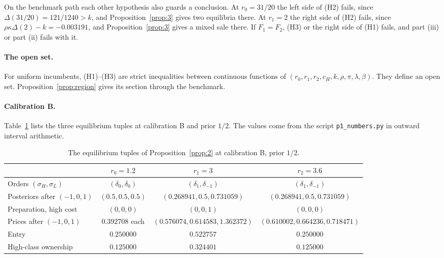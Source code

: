 \documentclass[11pt]{article}
\theoremstyle{definition}
\begin{document}
On the benchmark path each other hypothesis also guards a conclusion. At $r_0=31/20$ the left side of (H2)
fails, since $\Delta(31/20)=121/1240>k$, and Proposition~\ref{prop:3} gives two equilibria there. At $r_1=2$ the
right side of (H2) fails, since $\rho\kappa\Delta(2)-k=-0.003191$, and Proposition~\ref{prop:3} gives a mixed sale
there. If $F_1=F_2$, (H3) or the right side of (H1) fails, and part (iii) or part (ii) fails with it.

\paragraph{The open set.} For uniform incumbents, (H1)--(H3) are strict inequalities between continuous
functions of $(r_0,r_1,r_2,c_H,k,\rho,\pi,\lambda,\beta)$. They define an open set. Proposition~\ref{prop:region}
gives its section through the benchmark.

\paragraph{Calibration B.} Table~\ref{tab:prop2} lists the three equilibrium tuples at calibration B and prior
$1/2$. The values come from the script \texttt{p1\_numbers.py} in outward interval arithmetic.

\begin{table}[h]
\centering
\caption{The equilibrium tuples of Proposition~\ref{prop:2} at calibration B, prior $1/2$.}\label{tab:prop2}
\small
\setlength{\tabcolsep}{4pt}
\begin{tabular}{@{}lccc@{}}
\toprule
 & $r_0=1.2$ & $r_1=3$ & $r_2=3.6$\\
\midrule
Orders $(\sigma_H,\sigma_L)$ & $(\delta_0,\delta_0)$ & $(\delta_1,\delta_{-1})$ & $(\delta_1,\delta_{-1})$\\
Posteriors after $(-1,0,1)$ & $(0.5,0.5,0.5)$ & $(0.268941,0.5,0.731059)$ & $(0.268941,0.5,0.731059)$\\
Preparation, high cost & $(0,0,0)$ & $(0,0,1)$ & $(0,0,0)$\\
Prices after $(-1,0,1)$ & $0.392708$ each & $(0.576074,0.614583,1.362372)$ & $(0.610002,0.664236,0.718471)$\\
Entry & $0.250000$ & $0.522757$ & $0.250000$\\
High-class ownership & $0.125000$ & $0.324401$ & $0.125000$\\
\bottomrule
\end{tabular}
\end{table}
\end{document}
